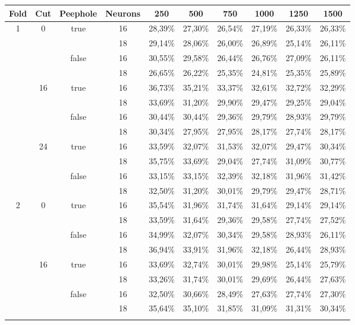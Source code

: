\begin{sidewaystable*}
\centering
\begin{tabular}{|c|c|c|c|c|c|c|c|c|c|}
\hline
 \textbf{Fold} & \textbf{Cut} & \textbf{Peephole} & \textbf{Neurons} & \textbf{250} & \textbf{500} & \textbf{750} & \textbf{1000} & \textbf{1250} & \textbf{1500}\\
 \hline
 \multirow{12}{*}{1}&\multirow{4}{*}{0}&\multirow{2}{*}{true}&16&28,39\%&27,30\%&26,54\%&27,19\%&26,33\%&26,33\%\\\cline{4-10}
  & & &18&29,14\%&28,06\%&26,00\%&26,89\%&25,14\%&26,11\%\\\cline{3-10}
  & &\multirow{2}{*}{false}&16&30,55\%&29,58\%&26,44\%&26,76\%&27,09\%&26,11\%\\\cline{4-10}
  & & &18&26,65\%&26,22\%&25,35\%&24,81\%&25,35\%&25,89\%\\\cline{2-10}
  
  &\multirow{4}{*}{16}&\multirow{2}{*}{true}&16&36,73\%&35,21\%&33,37\%&32,61\%&32,72\%&32,29\%\\\cline{4-10}
  & & &18&33,69\%&31,20\%&29,90\%&29,47\%&29,25\%&29,04\%\\\cline{3-10}
  & &\multirow{2}{*}{false}&16&30,44\%&30,44\%&29,36\%&29,79\%&28,93\%&29,79\%\\\cline{4-10}
  & & &18&30,34\%&27,95\%&27,95\%&28,17\%&27,74\%&28,17\%\\\cline{2-10}
  
  &\multirow{4}{*}{24}&\multirow{2}{*}{true}&16&33,59\%&32,07\%&31,53\%&32,07\%&29,47\%&30,34\%\\\cline{4-10}
  & & &18&35,75\%&33,69\%&29,04\%&27,74\%&31,09\%&30,77\%\\\cline{3-10}
  & &\multirow{2}{*}{false}&16&33,15\%&33,15\%&32,39\%&32,18\%&31,96\%&31,42\%\\\cline{4-10}
  & & &18&32,50\%&31,20\%&30,01\%&29,79\%&29,47\%&28,71\%\\\hline
  
  \multirow{12}{*}{2}&\multirow{4}{*}{0}&\multirow{2}{*}{true}&16&35,54\%&31,96\%&31,74\%&31,64\%&29,14\%&29,14\%\\\cline{4-10}
  & & &18&33,59\%&31,64\%&29,36\%&29,58\%&27,74\%&27,52\%\\\cline{3-10}
  & &\multirow{2}{*}{false}&16&34,99\%&32,07\%&30,34\%&29,58\%&28,93\%&26,11\%\\\cline{4-10}
  & & &18&36,94\%&33,91\%&31,96\%&32,18\%&26,44\%&28,93\%\\\cline{2-10}

  &\multirow{4}{*}{16}&\multirow{2}{*}{true}&16&33,69\%&32,74\%&30,01\%&29,98\%&25,14\%&25,79\%\\\cline{4-10}
  & & &18&33,26\%&31,74\%&30,01\%&29,69\%&26,44\%&27,63\%\\\cline{3-10}
  & &\multirow{2}{*}{false}&16&32,50\%&30,66\%&28,49\%&27,63\%&27,74\%&27,30\%\\\cline{4-10}
  & & &18&35,64\%&35,10\%&31,85\%&31,09\%&31,31\%&30,34\%\\\cline{2-10}
  

\end{tabular}
\end{sidewaystable*}
